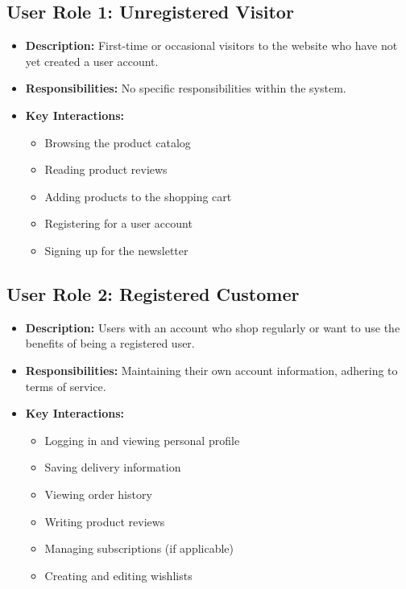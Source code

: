 \documentclass[a4paper,11pt]{article}
\begin{document}
\subsection{User Role 1: Unregistered Visitor}
\begin{itemize}
    \item \textbf{Description:} First-time or occasional visitors to the website who have not yet created a user account.
    \item \textbf{Responsibilities:} No specific responsibilities within the system.
    \item \textbf{Key Interactions:}
    \begin{itemize}
        \item Browsing the product catalog
        \item Reading product reviews
        \item Adding products to the shopping cart
        \item Registering for a user account
        \item Signing up for the newsletter
    \end{itemize}
\end{itemize}

\subsection{User Role 2: Registered Customer}
\begin{itemize}
    \item \textbf{Description:} Users with an account who shop regularly or want to use the benefits of being a registered user.
    \item \textbf{Responsibilities:} Maintaining their own account information, adhering to terms of service.
    \item \textbf{Key Interactions:}
    \begin{itemize}
        \item Logging in and viewing personal profile
        \item Saving delivery information
        \item Viewing order history
        \item Writing product reviews
        \item Managing subscriptions (if applicable)
        \item Creating and editing wishlists
    \end{itemize}
\end{itemize}
\end{document}
